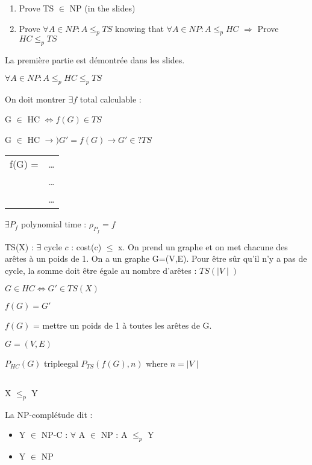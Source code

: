 \begin{enumerate}
    \item Prove TS $\in$ NP (in the slides)
    \item Prove $\forall A \in NP : A \leq_{p} TS$ knowing that $\forall
        A \in NP : A \leq_{p} HC $
        \subitem $\Rightarrow$ Prove $HC \leq_{p} TS$
\end{enumerate}

La première partie est démontrée dans les slides.

$\forall A \in NP : A \leq_{p} HC \leq_{p} TS$ 

On doit montrer $\exists f$ total calculable :

G $\in$ HC $\Leftrightarrow f(G) \in TS$

G $\in$ HC $\rightarrow) G' = f(G) \rightarrow G' \in? TS$ 

\begin{tabular}{ll}
    f(G) = & \dots\\
    & \dots \\
    & \dots \\
\end{tabular}

$\exists P_{f}$ polynomial time : $\rho_{P_{f}} = f$

TS(X) : $\exists$ cycle $c$ : cost(c) $\leq$ x. On prend un graphe et on
met chacune des arêtes à un poids de 1. On a un graphe G=(V,E). Pour être
sûr qu'il n'y a pas de cycle, la somme doit être égale au nombre
d'arêtes : $TS(\mid V\mid)$

$G \in HC \Leftrightarrow G' \in TS(X)$

$f(G) = G'$

$f(G)$ = mettre un poids de 1 à toutes les arêtes de G.

$G=(V,E)$

$P_{HC}(G)$ tripleegal $P_{TS}(f(G), n)$ where $n = \mid V\mid$ 

\subsection{}

X $\leq_{p}$ Y

La NP-complétude dit : 

\begin{itemize}
    \item Y $\in$ NP-C : $\forall$ A $\in$ NP : A $\leq_{p}$ Y
    \item Y $\in$ NP
\end{itemize}

